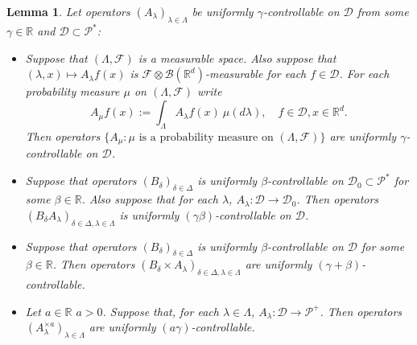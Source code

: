 \documentclass[12pt,oneside,english]{amsart}
\theoremstyle{plain}
\newtheorem{lem}[thm]{Lemma}
\theoremstyle{definition}
\numberwithin{equation}{section}
\newcommand{\added}[1]{{\color{blue}#1}}\newcommand{\deleted}[1]{{\color{red}#1}}
\begin{document}
\begin{lem}
\label{lem: property of controllable operators}
    Let operators $(A_\lambda)_{\lambda\in \Lambda}$ be uniformly $\gamma$-controllable on $\mathcal D$ from some $\gamma \in \mathbb R$ and $\mathcal D\subset \mathcal P^*$:
\begin{itemize}
\item[(1)]
    Suppose that $(\Lambda, \mathscr F)$ is a measurable space.
    Also suppose that $(\lambda,x)\mapsto A_\lambda f(x)$ is $\mathscr F \otimes \mathscr B(\mathbb R^d)$-measurable for each $f\in \mathcal D$.
    For each probability measure $\mu$ on $(\Lambda, \mathscr F)$ write
\[
    A_\mu f(x):= \int_{\Lambda} A_\lambda f (x)~\mu(d\lambda), \quad f\in \mathcal D, x\in \mathbb R^d.
\]
    Then operators $\{A_\mu: \mu \text{ is  a probability measure on } (\Lambda, \mathscr F)\}$ are uniformly $\gamma$-controllable on $\mathcal D$.
\item[(2)]
    Suppose that operators $(B_\delta)_{\delta\in \Delta}$ is uniformly $\beta$-controllable on $\mathcal D_0 \subset \mathcal P^*$ \added{for some $\beta \in \mathbb R$}.
    Also suppose that for each $\lambda$, $A_\lambda:\mathcal D \to \mathcal D_0$.
    Then operators $(B_\delta A_\lambda)_{\delta\in \Delta, \lambda \in \Lambda}$ is uniformly $(\gamma\beta)$-controllable on $\mathcal D$.
\item[(3)]
    Suppose that operators $(B_\delta)_{\delta \in \Delta}$ is uniformly $\beta$-controllable on $\mathcal D$ for some $\beta\in \mathbb R$.
    Then operators $(B_\delta\times A_\lambda)_{\delta \in \Delta, \lambda \in \Lambda}$ are uniformly $(\gamma+\beta)$-controllable.
\item[(4)]
    Let \deleted{$a\in \mathbb R$} \added{$a>0$}. Suppose that, for each $\lambda \in \Lambda$, $A_\lambda : \mathcal D \to \mathcal P^+$.
    Then operators $(A^{\times a}_\lambda)_{\lambda \in \Lambda}$ are uniformly $(a\gamma)$-controllable.
\end{itemize}
\end{lem}
\end{document}
